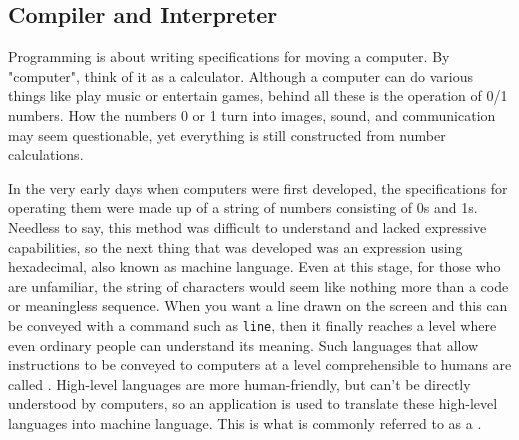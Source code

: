 \documentclass{ltjsbook}
\begin{document}
\subsection{Compiler and Interpreter}

Programming is about writing specifications for moving a computer. By "computer", think of it as a calculator. Although a computer can do various things like play music or entertain games, behind all these is the operation of 0/1 numbers. How the numbers 0 or 1 turn into images, sound, and communication may seem questionable, yet everything is still constructed from number calculations.

In the very early days when computers were first developed, the specifications for operating them were made up of a string of numbers consisting of 0s and 1s. Needless to say, this method was difficult to understand and lacked expressive capabilities, so the next thing that was developed was an expression using hexadecimal, also known as machine language. Even at this stage, for those who are unfamiliar, the string of characters would seem like nothing more than a code or meaningless sequence. When you want a line drawn on the screen and this can be conveyed with a command such as \texttt{line}, then it finally reaches a level where even ordinary people can understand its meaning. Such languages that allow instructions to be conveyed to computers at a level comprehensible to humans are called . High-level languages are more human-friendly, but can't be directly understood by computers, so an application is used to translate these high-level languages into machine language. This is what is commonly referred to as a .
\end{document}
